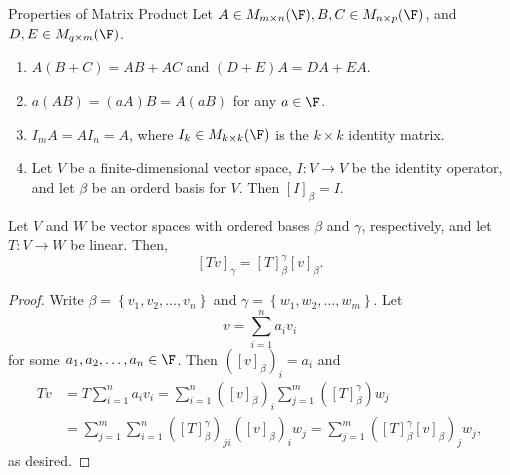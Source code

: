 \documentclass[linearalgebra]{subfiles}
\begin{document}
    \begin{prop}{Properties of Matrix Product}
        Let $A\in M_{m\times n}(\F), B,C\in M_{n\times p}(\F)$, and $D,E\in M_{q\times m}(\F)$.
        \begin{enumerate}
            \item $A\left( B+C \right) = AB+AC$ and $\left( D+E \right) A = DA+EA$.
            \item $a\left( AB \right) = \left( aA \right) B = A\left( aB \right)$ for any $a\in\F$.
            \item $I_mA = AI_n = A$, where $I_k\in M_{k\times k}(\F)$ is the $k\times k$ identity matrix. 
            \item Let $V$ be a finite-dimensional vector space, $I:V\to V$ be the identity operator, and let $\beta$ be an orderd basis for $V$. Then $\left[ I \right] _\beta = I$.
        \end{enumerate}
    \end{prop}

    \begin{prop}{}
        Let $V$ and $W$ be vector spaces with ordered bases $\beta$ and $\gamma$, respectively, and let $T:V\to W$ be linear. Then,
        \begin{equation*}
            \left[ Tv \right] _\gamma = \left[ T \right] ^\gamma_\beta \left[ v \right] _\beta.
        \end{equation*}
    \end{prop}

    \begin{proof}
        Write $\beta=\left\lbrace v_1,v_2,\ldots,v_n \right\rbrace$ and $\gamma=\left\lbrace w_1,w_2,\ldots,w_m \right\rbrace$. Let
        \begin{equation*}
            v = \sum^{n}_{i=1} a_iv_i
        \end{equation*}
        for some $a_1,a_2,\ldots,a_n\in\F$. Then $\left( \left[ v \right] _\beta \right) _i = a_i$ and 
        \begin{align*}
            Tv & = T\sum^{n}_{i=1} a_iv_i = \sum^{n}_{i=1} \left( \left[ v \right] _\beta \right) _i\sum^{m}_{j=1} \left( \left[ T \right] ^\gamma_\beta \right) w_j \\
               & = \sum^{m}_{j=1} \sum^{n}_{i=1} \left( \left[ T \right] ^\gamma_\beta \right) _{ji}\left( \left[ v \right] _\beta \right) _i w_j = \sum^{m}_{j=1} \left( \left[ T \right] ^\gamma_\beta \left[ v \right] _\beta \right) _jw_j,
        \end{align*} 
        as desired.
    \end{proof}
\end{document}
